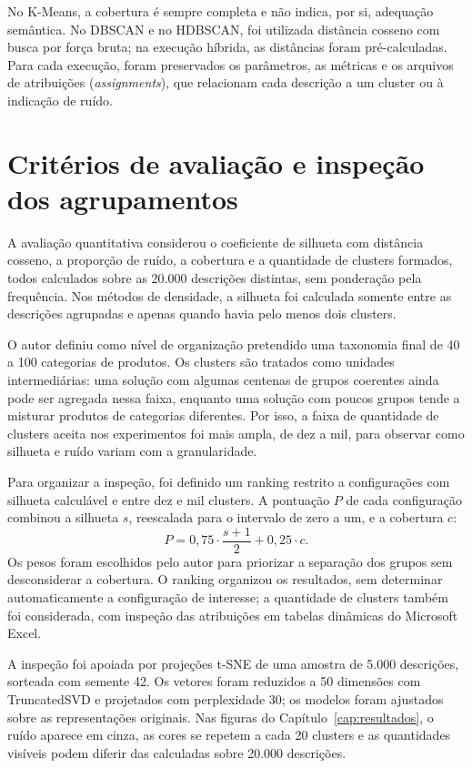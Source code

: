 \documentclass[english,brazilian]{UNISINOSmonografia}
\begin{document}
No K-Means, a cobertura é sempre completa e não indica, por si, adequação semântica. No DBSCAN e no HDBSCAN, foi utilizada distância cosseno com busca por força bruta; na execução híbrida, as distâncias foram pré-calculadas. Para cada execução, foram preservados os parâmetros, as métricas e os arquivos de atribuições (\textit{assignments}), que relacionam cada descrição a um cluster ou à indicação de ruído.

\section{Critérios de avaliação e inspeção dos agrupamentos}
\label{sec:criterios}

A avaliação quantitativa considerou o coeficiente de silhueta com distância cosseno, a proporção de ruído, a cobertura e a quantidade de clusters formados, todos calculados sobre as 20.000 descrições distintas, sem ponderação pela frequência. Nos métodos de densidade, a silhueta foi calculada somente entre as descrições agrupadas e apenas quando havia pelo menos dois clusters.

O autor definiu como nível de organização pretendido uma taxonomia final de 40 a 100 categorias de produtos. Os clusters são tratados como unidades intermediárias: uma solução com algumas centenas de grupos coerentes ainda pode ser agregada nessa faixa, enquanto uma solução com poucos grupos tende a misturar produtos de categorias diferentes. Por isso, a faixa de quantidade de clusters aceita nos experimentos foi mais ampla, de dez a mil, para observar como silhueta e ruído variam com a granularidade.

Para organizar a inspeção, foi definido um ranking restrito a configurações com silhueta calculável e entre dez e mil clusters. A pontuação $P$ de cada configuração combinou a silhueta $s$, reescalada para o intervalo de zero a um, e a cobertura $c$:
\begin{equation}
P = 0{,}75\cdot\frac{s+1}{2} + 0{,}25\cdot c.
\label{eq:pontuacao}
\end{equation}
Os pesos foram escolhidos pelo autor para priorizar a separação dos grupos sem desconsiderar a cobertura. O ranking organizou os resultados, sem determinar automaticamente a configuração de interesse; a quantidade de clusters também foi considerada, com inspeção das atribuições em tabelas dinâmicas do Microsoft Excel.

A inspeção foi apoiada por projeções t-SNE \cite{vandermaaten2008tsne} de uma amostra de 5.000 descrições, sorteada com semente 42. Os vetores foram reduzidos a 50 dimensões com TruncatedSVD e projetados com perplexidade 30; os modelos foram ajustados sobre as representações originais. Nas figuras do Capítulo~\ref{cap:resultados}, o ruído aparece em cinza, as cores se repetem a cada 20 clusters e as quantidades visíveis podem diferir das calculadas sobre 20.000 descrições.
\end{document}
